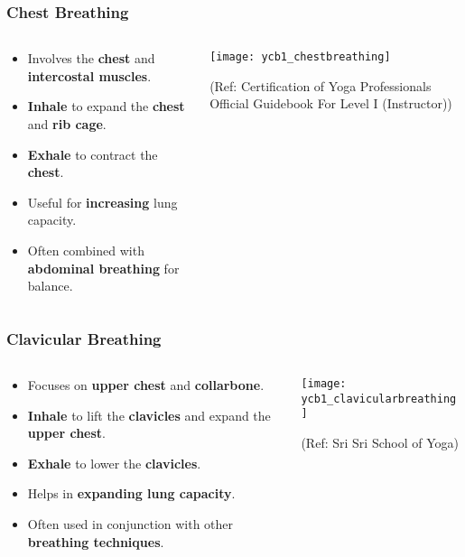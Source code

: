 \begin{frame}[fragile]\frametitle{Chest Breathing}
\begin{columns}
    \begin{column}[T]{0.5\linewidth}
      \begin{itemize}
        \item Involves the \textbf{chest} and \textbf{intercostal muscles}.
        \item \textbf{Inhale} to expand the \textbf{chest} and \textbf{rib cage}.
        \item \textbf{Exhale} to contract the \textbf{chest}.
        \item Useful for \textbf{increasing} lung capacity.
        \item Often combined with \textbf{abdominal breathing} for balance.
      \end{itemize}
    \end{column}
    \begin{column}[T]{0.5\linewidth}
        \begin{center}
        \texttt{[image: ycb1\_chestbreathing]}
				
		{\tiny (Ref: Certification  of Yoga Professionals Official Guidebook For Level I (Instructor))}	  
        \end{center}	
    \end{column}
\end{columns}
\end{frame}

\begin{frame}[fragile]\frametitle{Clavicular Breathing}
\begin{columns}
    \begin{column}[T]{0.5\linewidth}
      \begin{itemize}
        \item Focuses on \textbf{upper chest} and \textbf{collarbone}.
        \item \textbf{Inhale} to lift the \textbf{clavicles} and expand the \textbf{upper chest}.
        \item \textbf{Exhale} to lower the \textbf{clavicles}.
        \item Helps in \textbf{expanding lung capacity}.
        \item Often used in conjunction with other \textbf{breathing techniques}.
      \end{itemize}
    \end{column}
    \begin{column}[T]{0.5\linewidth}
        \begin{center}
        \texttt{[image: ycb1\_clavicularbreathing]}
				
		{\tiny (Ref: Sri Sri School of Yoga)}	  
        \end{center}	
    \end{column}
\end{columns}
\end{frame}

